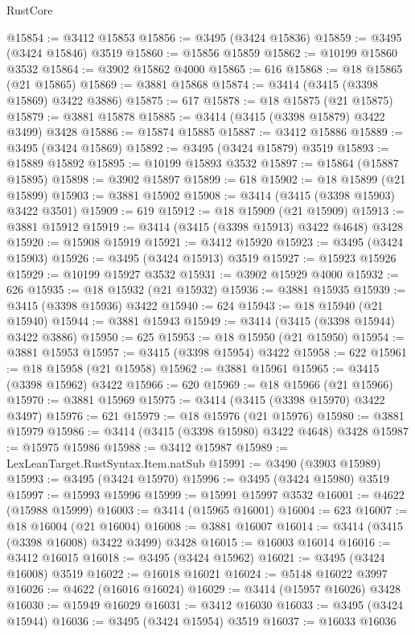 \begin{lexlean}{RustCore}
\begin{coremodule}
@15854 := @3412 @15853
@15856 := @3495 (@3424 @15836)
@15859 := @3495 (@3424 @15846) @3519
@15860 := @15856 @15859
@15862 := @10199 @15860 @3532
@15864 := @3902 @15862 @4000
@15865 := 616
@15868 := @18 @15865 (@21 @15865)
@15869 := @3881 @15868
@15874 := @3414 (@3415 (@3398 @15869) @3422 @3886)
@15875 := 617
@15878 := @18 @15875 (@21 @15875)
@15879 := @3881 @15878
@15885 := @3414 (@3415 (@3398 @15879) @3422 @3499) @3428
@15886 := @15874 @15885
@15887 := @3412 @15886
@15889 := @3495 (@3424 @15869)
@15892 := @3495 (@3424 @15879) @3519
@15893 := @15889 @15892
@15895 := @10199 @15893 @3532
@15897 := @15864 (@15887 @15895)
@15898 := @3902 @15897
@15899 := 618
@15902 := @18 @15899 (@21 @15899)
@15903 := @3881 @15902
@15908 := @3414 (@3415 (@3398 @15903) @3422 @3501)
@15909 := 619
@15912 := @18 @15909 (@21 @15909)
@15913 := @3881 @15912
@15919 := @3414 (@3415 (@3398 @15913) @3422 @4648) @3428
@15920 := @15908 @15919
@15921 := @3412 @15920
@15923 := @3495 (@3424 @15903)
@15926 := @3495 (@3424 @15913) @3519
@15927 := @15923 @15926
@15929 := @10199 @15927 @3532
@15931 := @3902 @15929 @4000
@15932 := 626
@15935 := @18 @15932 (@21 @15932)
@15936 := @3881 @15935
@15939 := @3415 (@3398 @15936) @3422
@15940 := 624
@15943 := @18 @15940 (@21 @15940)
@15944 := @3881 @15943
@15949 := @3414 (@3415 (@3398 @15944) @3422 @3886)
@15950 := 625
@15953 := @18 @15950 (@21 @15950)
@15954 := @3881 @15953
@15957 := @3415 (@3398 @15954) @3422
@15958 := 622
@15961 := @18 @15958 (@21 @15958)
@15962 := @3881 @15961
@15965 := @3415 (@3398 @15962) @3422
@15966 := 620
@15969 := @18 @15966 (@21 @15966)
@15970 := @3881 @15969
@15975 := @3414 (@3415 (@3398 @15970) @3422 @3497)
@15976 := 621
@15979 := @18 @15976 (@21 @15976)
@15980 := @3881 @15979
@15986 := @3414 (@3415 (@3398 @15980) @3422 @4648) @3428
@15987 := @15975 @15986
@15988 := @3412 @15987
@15989 := LexLeanTarget.RustSyntax.Item.natSub
@15991 := @3490 (@3903 @15989)
@15993 := @3495 (@3424 @15970)
@15996 := @3495 (@3424 @15980) @3519
@15997 := @15993 @15996
@15999 := @15991 @15997 @3532
@16001 := @4622 (@15988 @15999)
@16003 := @3414 (@15965 @16001)
@16004 := 623
@16007 := @18 @16004 (@21 @16004)
@16008 := @3881 @16007
@16014 := @3414 (@3415 (@3398 @16008) @3422 @3499) @3428
@16015 := @16003 @16014
@16016 := @3412 @16015
@16018 := @3495 (@3424 @15962)
@16021 := @3495 (@3424 @16008) @3519
@16022 := @16018 @16021
@16024 := @5148 @16022 @3997
@16026 := @4622 (@16016 @16024)
@16029 := @3414 (@15957 @16026) @3428
@16030 := @15949 @16029
@16031 := @3412 @16030
@16033 := @3495 (@3424 @15944)
@16036 := @3495 (@3424 @15954) @3519
@16037 := @16033 @16036

\end{coremodule}
\end{lexlean}
